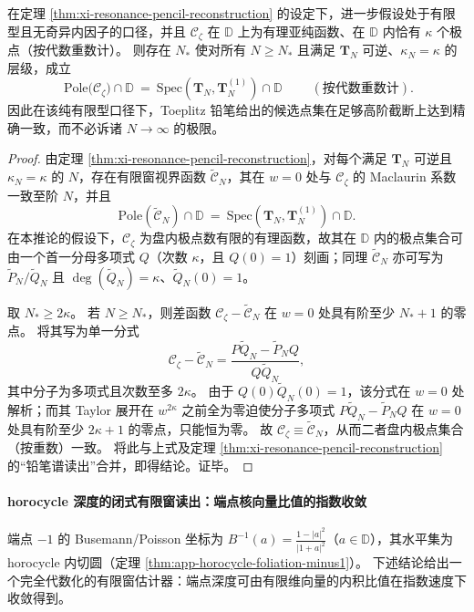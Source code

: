 \begin{corollary}[有限型情形的有限阶精确定位]\label{cor:xi-resonance-pencil-finite-order-exactness}
在定理 \ref{thm:xi-resonance-pencil-reconstruction} 的设定下，进一步假设处于有限型且无奇异内因子的口径，并且 \(\mathscr{C}_{\zeta}\) 在 \(\mathbb{D}\) 上为有理亚纯函数、在 \(\mathbb{D}\) 内恰有 \(\kappa\) 个极点（按代数重数计）。
则存在 \(N_\ast\) 使对所有 \(N\ge N_\ast\) 且满足 \(\mathbf{T}_N\) 可逆、\(\kappa_N=\kappa\) 的层级，成立
\[
\boxed{\;
\mathrm{Pole}\bigl(\mathscr{C}_{\zeta}\bigr)\cap\mathbb{D}
\ =\
\mathrm{Spec}(\mathbf{T}_N,\mathbf{T}_N^{(1)})\cap\mathbb{D}\;}
\qquad(\text{按代数重数计}).
\]
因此在该纯有限型口径下，Toeplitz 铅笔给出的候选点集在足够高阶截断上达到精确一致，而不必诉诸 \(N\to\infty\) 的极限。
\end{corollary}
\begin{proof}
由定理 \ref{thm:xi-resonance-pencil-reconstruction}，对每个满足 \(\mathbf{T}_N\) 可逆且 \(\kappa_N=\kappa\) 的 \(N\)，存在有限窗视界函数 \(\widetilde{\mathscr{C}}_{N}\)，其在 \(w=0\) 处与 \(\mathscr{C}_{\zeta}\) 的 Maclaurin 系数一致至阶 \(N\)，并且
\[
\mathrm{Pole}(\widetilde{\mathscr{C}}_{N})\cap\mathbb{D}
\ =\
\mathrm{Spec}(\mathbf{T}_N,\mathbf{T}_N^{(1)})\cap\mathbb{D}.
\]
在本推论的假设下，\(\mathscr{C}_{\zeta}\) 为盘内极点数有限的有理函数，故其在 \(\mathbb{D}\) 内的极点集合可由一个首一分母多项式 \(Q\)（次数 \(\kappa\)，且 \(Q(0)=1\)）刻画；同理 \(\widetilde{\mathscr{C}}_{N}\) 亦可写为 \(\widetilde P_N/\widetilde Q_N\) 且 \(\deg(\widetilde Q_N)=\kappa\)、\(\widetilde Q_N(0)=1\)。
\par
取 \(N_\ast\ge 2\kappa\)。
若 \(N\ge N_\ast\)，则差函数 \(\mathscr{C}_{\zeta}-\widetilde{\mathscr{C}}_{N}\) 在 \(w=0\) 处具有阶至少 \(N_\ast{+}1\) 的零点。
将其写为单一分式
\[
\mathscr{C}_{\zeta}-\widetilde{\mathscr{C}}_{N}
=\frac{P\widetilde Q_N-\widetilde P_N Q}{Q\widetilde Q_N},
\]
其中分子为多项式且次数至多 \(2\kappa\)。
由于 \(Q(0)\widetilde Q_N(0)=1\)，该分式在 \(w=0\) 处解析；而其 Taylor 展开在 \(w^{2\kappa}\) 之前全为零迫使分子多项式 \(P\widetilde Q_N-\widetilde P_N Q\) 在 \(w=0\) 处具有阶至少 \(2\kappa{+}1\) 的零点，只能恒为零。
故 \(\mathscr{C}_{\zeta}\equiv \widetilde{\mathscr{C}}_{N}\)，从而二者盘内极点集合（按重数）一致。
将此与上式及定理 \ref{thm:xi-resonance-pencil-reconstruction} 的“铅笔谱读出”合并，即得结论。证毕。
\end{proof}

\paragraph{horocycle 深度的闭式有限窗读出：端点核向量比值的指数收敛}
端点 \(-1\) 的 Busemann/Poisson 坐标为
\(
B^{-1}(a)=\frac{1-|a|^2}{|1+a|^2}
\)（\(a\in\mathbb{D}\)），其水平集为 horocycle 内切圆（定理 \ref{thm:app-horocycle-foliation-minus1}）。
下述结论给出一个完全代数化的有限窗估计器：端点深度可由有限维向量的内积比值在指数速度下收敛得到。

